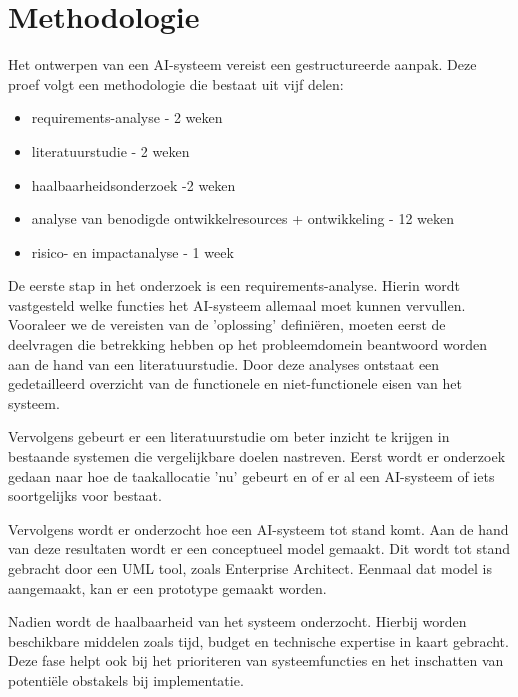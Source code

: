 \section{Methodologie}
\label{sec:methodologie}

Het ontwerpen van een AI-systeem vereist een gestructureerde aanpak. Deze proef volgt een methodologie die bestaat uit vijf delen:
\begin{itemize}
    \item requirements-analyse - 2 weken
    \item literatuurstudie - 2 weken
    \item haalbaarheidsonderzoek -2 weken
    \item analyse van benodigde ontwikkelresources + ontwikkeling - 12 weken
    \item risico- en impactanalyse - 1 week
\end{itemize}

\vspace{1em}De eerste stap in het onderzoek is een requirements-analyse. Hierin wordt vastgesteld welke functies het AI-systeem allemaal moet kunnen vervullen. Vooraleer we de vereisten van de 'oplossing' definiëren, moeten eerst de deelvragen die betrekking hebben op het probleemdomein beantwoord worden aan de hand van een literatuurstudie. Door deze analyses ontstaat een gedetailleerd overzicht van de functionele en niet-functionele eisen van het systeem.

\vspace{1em}Vervolgens gebeurt er een literatuurstudie om beter inzicht te krijgen in bestaande systemen die vergelijkbare doelen nastreven. Eerst wordt er onderzoek gedaan naar hoe de taakallocatie 'nu' gebeurt en of er al een AI-systeem of iets soortgelijks voor bestaat.

Vervolgens wordt er onderzocht hoe een AI-systeem tot stand komt. Aan de hand van deze resultaten wordt er een conceptueel model gemaakt. Dit wordt tot stand gebracht door een UML tool, zoals Enterprise Architect. Eenmaal dat model is aangemaakt, kan er een prototype gemaakt worden.

\vspace{1em}Nadien wordt de haalbaarheid van het systeem onderzocht. Hierbij worden beschikbare middelen zoals tijd, budget en technische expertise in kaart gebracht. Deze fase helpt ook bij het prioriteren van systeemfuncties en het inschatten van potentiële obstakels bij implementatie.

